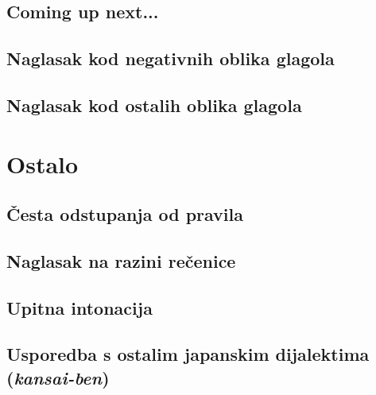 \documentclass[12pt]{extarticle}
\begin{document}
	\subsection*{Coming up next...}
	\subsection{Naglasak kod negativnih oblika glagola}
	\subsection{Naglasak kod ostalih oblika glagola}
	
	\section{Ostalo}
	\subsection{Česta odstupanja od pravila}
	\subsection{Naglasak na razini rečenice}
	\subsection{Upitna intonacija}
	\subsection{Usporedba s ostalim japanskim dijalektima (\textit{kansai-ben})}
\end{document}
